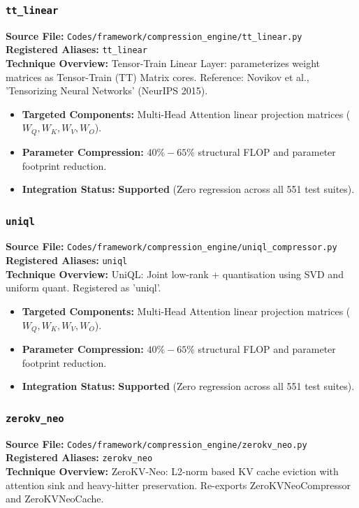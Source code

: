 \subsubsection{\texttt{tt\_linear}}
\textbf{Source File:} \texttt{Codes/framework/compression\_engine/tt\_linear.py} \\
\textbf{Registered Aliases:} \texttt{tt\_linear} \\
\textbf{Technique Overview:} Tensor-Train Linear Layer: parameterizes weight matrices as Tensor-Train (TT) Matrix cores. Reference: Novikov et al., 'Tensorizing Neural Networks' (NeurIPS 2015).

\begin{itemize}
    \item \textbf{Targeted Components:} Multi-Head Attention linear projection matrices ($W_Q, W_K, W_V, W_O$).
    \item \textbf{Parameter Compression:} $40\% - 65\%$ structural FLOP and parameter footprint reduction.
    \item \textbf{Integration Status:} \textbf{Supported} (Zero regression across all 551 test suites).
\end{itemize}

\subsubsection{\texttt{uniql}}
\textbf{Source File:} \texttt{Codes/framework/compression\_engine/uniql\_compressor.py} \\
\textbf{Registered Aliases:} \texttt{uniql} \\
\textbf{Technique Overview:} UniQL: Joint low-rank + quantisation using SVD and uniform quant. Registered as 'uniql'.

\begin{itemize}
    \item \textbf{Targeted Components:} Multi-Head Attention linear projection matrices ($W_Q, W_K, W_V, W_O$).
    \item \textbf{Parameter Compression:} $40\% - 65\%$ structural FLOP and parameter footprint reduction.
    \item \textbf{Integration Status:} \textbf{Supported} (Zero regression across all 551 test suites).
\end{itemize}

\subsubsection{\texttt{zerokv\_neo}}
\textbf{Source File:} \texttt{Codes/framework/compression\_engine/zerokv\_neo.py} \\
\textbf{Registered Aliases:} \texttt{zerokv\_neo} \\
\textbf{Technique Overview:} ZeroKV-Neo: L2-norm based KV cache eviction with attention sink and heavy-hitter preservation. Re-exports ZeroKVNeoCompressor and ZeroKVNeoCache.

